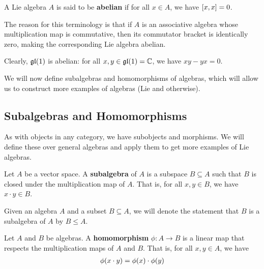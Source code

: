 \begin{definition}
    A Lie algebra $A$ is said to be \textbf{abelian} if for all $x \in A$, we have $\left[ x, x \right] = 0$.
\end{definition}

The reason for this terminology is that if $A$ is an associative algebra whose multiplication map is commutative, then its commutator bracket is identically zero, making the corresponding Lie algebra abelian.

\begin{boxexample}\label{Ch1:Eg:gl1}
    Clearly, $\mathfrak{gl}\!\left( 1 \right)$ is abelian: for all $x, y \in \mathfrak{gl}\!\left( 1 \right) = \mathbb{C}$, we have $xy - yx = 0$.
\end{boxexample}

We will now define subalgebras and homomorphisms of algebras, which will allow us to construct more examples of algebras (Lie and otherwise).

\subsection{Subalgebras and Homomorphisms}

As with objects in any category, we have subobjects and morphisms. We will define these over general algebras and apply them to get more examples of Lie algebras.

\begin{boxdefinition}[Subalgebras]
    Let $A$ be a vector space. A \textbf{subalgebra} of $A$ is a subspace $B \subseteq A$ such that $B$ is closed under the multiplication map of $A$. That is, for all $x, y \in B$, we have $x \cdot y \in B$.
\end{boxdefinition}

\begin{boxconvention}
    Given an algebra $A$ and a subset $B \subseteq A$, we will denote the statement that $B$ is a subalgebra of $A$ by $B \leq A$.
\end{boxconvention}

\begin{boxdefinition}[Homomorphisms]
    Let $A$ and $B$ be algebras. A \textbf{homomorphism} $\phi: A \to B$ is a linear map that respects the multiplication maps of $A$ and $B$. That is, for all $x, y \in A$, we have
    \begin{align*}
        \phi\!\left( x \cdot y \right) = \phi\!\left( x \right) \cdot \phi\!\left( y \right)
    \end{align*}
\end{boxdefinition}

